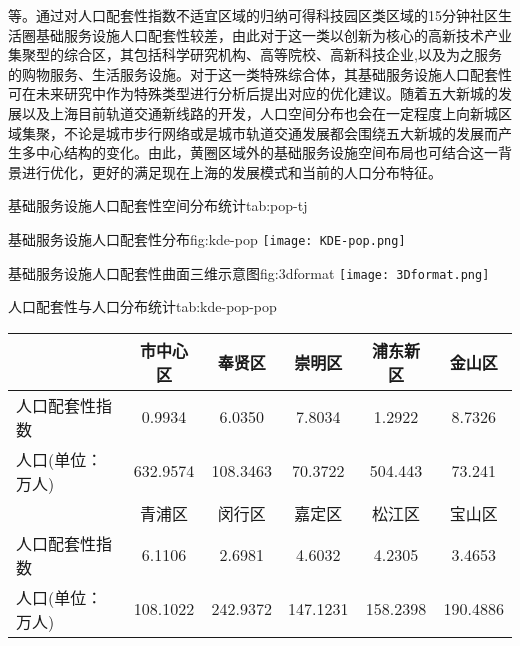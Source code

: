 \documentclass{shnuthesis}
\begin{document}
等。通过对人口配套性指数不适宜区域的归纳可得科技园区类区域的15分钟社区生活圈基础服务设施人口配套性较差，由此对于这一类以创新为核心的高新技术产业集聚型的综合区，其包括科学研究机构、高等院校、高新科技企业,以及为之服务的购物服务、生活服务设施。对于这一类特殊综合体，其基础服务设施人口配套性可在未来研究中作为特殊类型进行分析后提出对应的优化建议。随着五大新城的发展以及上海目前轨道交通新线路的开发，人口空间分布也会在一定程度上向新城区域集聚，不论是城市步行网络或是城市轨道交通发展都会围绕五大新城的发展而产生多中心结构的变化。由此，黄圈区域外的基础服务设施空间布局也可结合这一背景进行优化，更好的满足现在上海的发展模式和当前的人口分布特征。

\begin{generaltab}[htb]{基础服务设施人口配套性空间分布统计}{tab:pop-tj}
	\renewcommand\arraystretch{1.2} %
\end{generaltab}

\begin{generalfig}[htb]{基础服务设施人口配套性分布}{fig:kde-pop}
	\texttt{[image: KDE-pop.png]}
\end{generalfig}


\begin{generalfig}[htb]{基础服务设施人口配套性曲面三维示意图}{fig:3dformat}
	\texttt{[image: 3Dformat.png]}
\end{generalfig}


\begin{generaltab}[htb]{人口配套性与人口分布统计}{tab:kde-pop-pop}
	\begin{tabularx}{0.9\textwidth}{p{4.2cm}ccccc}
		\toprule[1.5pt]
          & 市中心区     & 奉贤区      & 崇明区      & 浦东新区     & 金山区      \\
        \midrule
人口配套性指数   & 0.9934   & 6.0350   & 7.8034   & 1.2922   & 8.7326   \\
人口(单位：万人) & 632.9574 & 108.3463 & 70.3722  & 504.443  & 73.241   \\
\midrule[1.5pt]
& 青浦区      & 闵行区      & 嘉定区      & 松江区      & 宝山区      \\
\midrule
人口配套性指数   & 6.1106   & 2.6981   & 4.6032   & 4.2305   & 3.4653   \\
人口(单位：万人) & 108.1022 & 242.9372 & 147.1231 & 158.2398 & 190.4886 \\
		\bottomrule[1.5pt]
	\end{tabularx}
\vspace{1em}
\end{generaltab}
\end{document}
